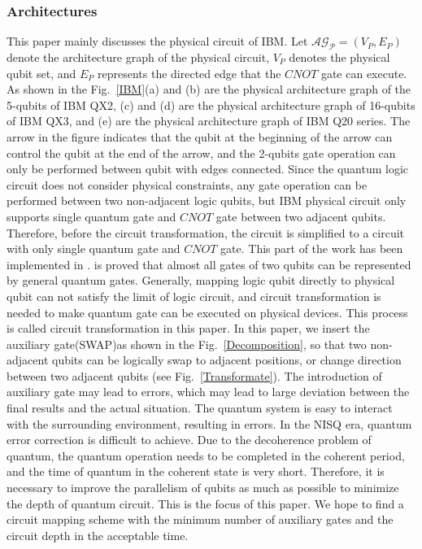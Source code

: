 \documentclass[runningheads]{llncs}
\begin{document}
\subsubsection{Architectures}
This paper mainly discusses the physical circuit of IBM. 
Let $\mathcal{\mathcal{AG}_{P}}=(V_{P},E_{P})$ denote the architecture graph of the physical circuit, 
$V_{P} $ denotes the physical qubit set, 
and $E_{P}$ represents the directed edge that the $CNOT$ gate can execute.
As shown in the Fig.~\ref{IBM}(a) and (b) are the physical architecture graph of the 5-qubits of IBM QX2, 
(c) and (d) are the physical architecture graph of 16-qubits of IBM QX3, 
and (e) are the physical architecture graph of IBM Q20 series. 
The arrow in the figure indicates that the qubit at the beginning of the arrow can control 
the qubit at the end of the arrow, and the 2-qubits gate operation can only be performed between 
qubit with edges connected. 
Since the quantum logic circuit does not consider physical constraints, 
any gate operation can be performed between two non-adjacent logic qubits, 
but IBM physical circuit only supports single quantum gate and $CNOT$ gate between two adjacent qubits. 
Therefore, before the circuit transformation, the circuit is simplified to a circuit with only single 
quantum gate and $CNOT$ gate. This part of the work has been implemented in \cite{2005Mttnen,1995Barenco}. 
\cite{Lloyd1995Almost} is proved that almost all gates of two qubits can be represented by general quantum gates. 
Generally, mapping logic qubit directly to physical qubit can not satisfy the limit of logic circuit, 
and circuit transformation is needed to make quantum gate can be executed on physical devices. 
This process is called circuit transformation in this paper. In this paper, we insert the 
auxiliary gate(SWAP)as shown in the Fig.~\ref{Decomposition},
so that two non-adjacent qubits can be logically swap to adjacent positions, 
or change direction between two adjacent qubits (see Fig.~\ref{Transformate}). 
The introduction of auxiliary gate may lead to errors, 
which may lead to large deviation between the final results and the actual situation. 
The quantum system is easy to interact with the surrounding environment, 
resulting in errors. In the NISQ era, quantum error correction is difficult to achieve. 
Due to the decoherence problem of quantum, the quantum operation needs to be completed in the coherent period, 
and the time of quantum in the coherent state is very short. Therefore, 
it is necessary to improve the parallelism of qubits as much as possible to minimize the depth 
of quantum circuit. This is the focus of this paper. We hope to find a circuit mapping scheme 
with the minimum number of auxiliary gates and the circuit depth in the acceptable time.
\end{document}
